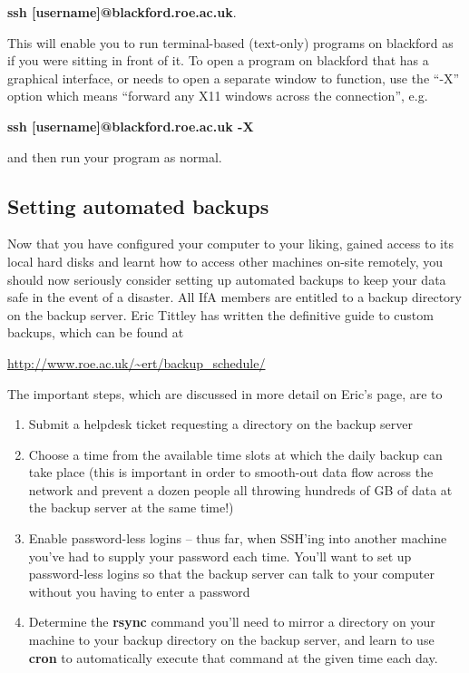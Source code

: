 {\bf ssh [username]@blackford.roe.ac.uk}.

This will enable you to run terminal-based (text-only) programs on {\sc blackford} as if you were sitting in front of it. To open a program on {\sc blackford} that has a graphical interface, or needs to open a separate window to function, use the ``-X'' option which means ``forward any X11 windows across the connection'', e.g.

{\bf ssh [username]@blackford.roe.ac.uk -X}

and then run your program as normal.

\subsection{Setting automated backups}

Now that you have configured your computer to your liking, gained access to its local hard disks and learnt how to access other machines on-site remotely, you should now seriously consider setting up automated backups to keep your data safe in the event of a disaster. All IfA members are entitled to a backup directory on the backup server. Eric Tittley has written the definitive guide to custom backups, which can be found at 

\url{http://www.roe.ac.uk/~ert/backup_schedule/}

The important steps, which are discussed in more detail on Eric's page, are to

\begin{enumerate}
\item Submit a helpdesk ticket requesting a directory on the backup server
\item Choose a time from the available time slots at which the daily backup can take place (this is important in order to smooth-out data flow across the network and prevent a dozen people all throwing hundreds of GB of data at the backup server at the same time!)
\item Enable password-less logins -- thus far, when SSH'ing into another machine you've had to supply your password each time. You'll want to set up password-less logins so that the backup server can talk to your computer without you having to enter a password
\item Determine the {\bf rsync} command you'll need to mirror a directory on your machine 
to your backup directory on the backup server, and learn to use {\bf cron} to automatically execute that command at the given time each day.
\end{enumerate}

